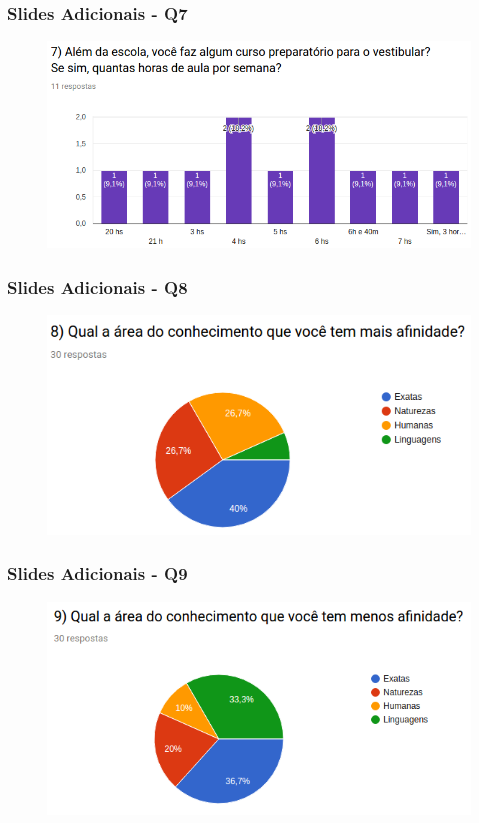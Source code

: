 \begin{frame}
\frametitle{Slides Adicionais - Q7}
\begin{figure}
\centering
\includegraphics[scale=0.40]{figuras/q7.png}
\end{figure}
\end{frame}

\begin{frame}
\frametitle{Slides Adicionais - Q8}
\begin{figure}
\centering
\includegraphics[scale=0.45]{figuras/q8.png}
\end{figure}
\end{frame}

\begin{frame}
\frametitle{Slides Adicionais - Q9}
\begin{figure}
\centering
\includegraphics[scale=0.45]{figuras/q9.png}
\end{figure}
\end{frame}

